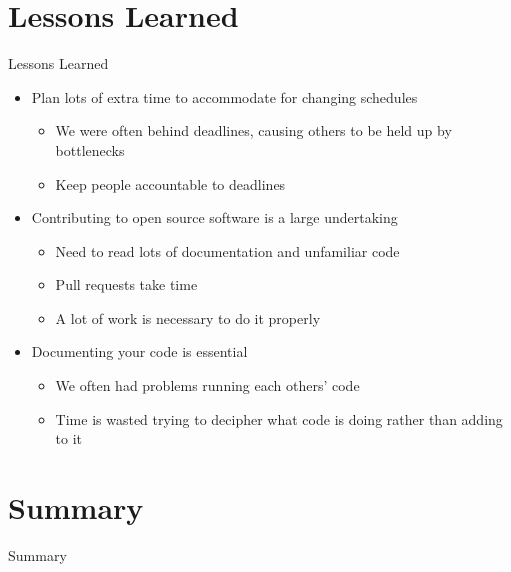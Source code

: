 \documentclass[xcolor=dvipsnames]{beamer}
\begin{document}
\section{Lessons Learned}\label{lessons-learned}
\begin{frame}{Lessons Learned}
\begin{itemize}
\itemsep1pt\parskip0pt
\item
  Plan lots of extra time to accommodate for changing schedules

  \begin{itemize}
  \itemsep1pt\parskip0pt
  \item
    We were often behind deadlines, causing others to be held up by
    bottlenecks
  \item
    Keep people accountable to deadlines
  \end{itemize}

\pause
\item
  Contributing to open source software is a large undertaking

  \begin{itemize}
  \itemsep1pt\parskip0pt
  \item
    Need to read lots of documentation and unfamiliar code
  \item
    Pull requests take time
  \item
    A lot of work is necessary to do it properly
  \end{itemize}

\pause
\item
  Documenting your code is essential

  \begin{itemize}
  \itemsep1pt\parskip0pt
  \item
    We often had problems running each others' code
  \item
    Time is wasted trying to decipher what code is doing rather than
    adding to it
  \end{itemize}
\end{itemize}
\end{frame}


\section{Summary}\label{summary}
\begin{frame}{Summary}
\tableofcontents
\end{frame}
\end{document}

